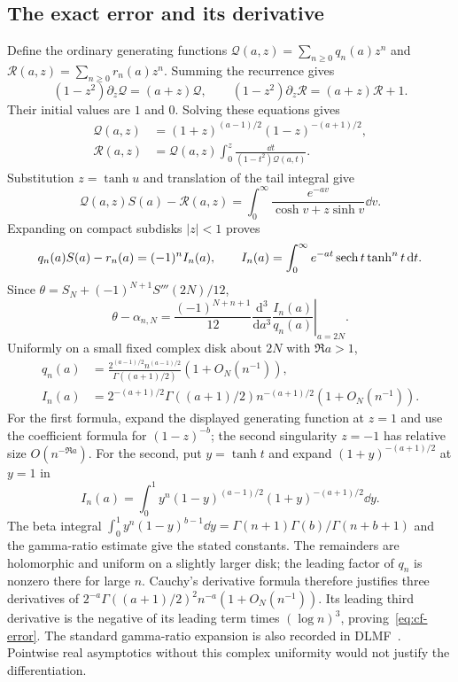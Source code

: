 \subsection{The exact error and its derivative}
Define the ordinary generating functions
$\mathcal Q(a,z)=\sum_{n\geq0}q_n(a)z^n$ and
$\mathcal R(a,z)=\sum_{n\geq0}r_n(a)z^n$.
Summing the recurrence gives
\[
 (1-z^2)\partial_z\mathcal Q=(a+z)\mathcal Q,\qquad
 (1-z^2)\partial_z\mathcal R=(a+z)\mathcal R+1.
\]
Their initial values are $1$ and $0$. Solving these equations gives
\begin{align*}
 \mathcal Q(a,z)&=(1+z)^{(a-1)/2}(1-z)^{-(a+1)/2},\\
 \mathcal R(a,z)&=\mathcal Q(a,z)
       \int_0^z\frac{\dd t}{(1-t^2)\mathcal Q(a,t)}.
\end{align*}
Substitution $z=\tanh u$ and
translation of the tail integral give
\[
 \mathcal Q(a,z)S(a)-\mathcal R(a,z)
       =\int_0^\infty\frac{e^{-av}}{\cosh v+z\sinh v}\dd v.
\]
Expanding on compact subdisks $|z|<1$ proves
\begin{equation}\label{eq:cf-integral}
 q_n(a)S(a)-r_n(a)=(-1)^n I_n(a),\qquad
 I_n(a)=\int_0^\infty e^{-at}\operatorname{sech} t\tanh^n t\,\mathrm d t.
\end{equation}
Since $\theta=S_N+(-1)^{N+1}S'''(2N)/12$,
\[
 \theta-\alpha_{n,N}=
 \frac{(-1)^{N+n+1}}{12}
 \left.\frac{\mathrm d^3}{\mathrm da^3}\frac{I_n(a)}{q_n(a)}
                                                        \right|_{a=2N}.
\]
Uniformly on a small fixed complex disk about $2N$ with $\Re a>1$,
\begin{align*}
 q_n(a)&=\frac{2^{(a-1)/2}n^{(a-1)/2}}{\Gamma((a+1)/2)}
                                      (1+O_N(n^{-1})),\\
 I_n(a)&=2^{-(a+1)/2}\Gamma((a+1)/2)n^{-(a+1)/2}
                                      (1+O_N(n^{-1})).
\end{align*}
For the first formula, expand the displayed generating function at
$z=1$ and use the coefficient formula for $(1-z)^{-b}$; the second
singularity $z=-1$ has relative size $O(n^{-\Re a})$. For the second,
put $y=\tanh t$ and expand $(1+y)^{-(a+1)/2}$ at $y=1$ in
\[
 I_n(a)=\int_0^1 y^n(1-y)^{(a-1)/2}(1+y)^{-(a+1)/2}\dd y.
\]
The beta integral
$\int_0^1y^n(1-y)^{b-1}\dd y=\Gamma(n+1)\Gamma(b)/\Gamma(n+b+1)$
and the gamma-ratio estimate give the stated constants.
The remainders are holomorphic and uniform on a slightly larger disk;
the leading factor of $q_n$ is nonzero there for large $n$.
Cauchy's derivative formula therefore justifies three derivatives of
$2^{-a}\Gamma((a+1)/2)^2n^{-a}(1+O_N(n^{-1}))$.
Its leading third derivative is the negative of its leading term times
$(\log n)^3$, proving~\eqref{eq:cf-error}. The standard gamma-ratio
expansion is also recorded in DLMF~\cite[Section 5.11(iii)]{DLMF}.
Pointwise real asymptotics without this complex uniformity would not
justify the differentiation.

